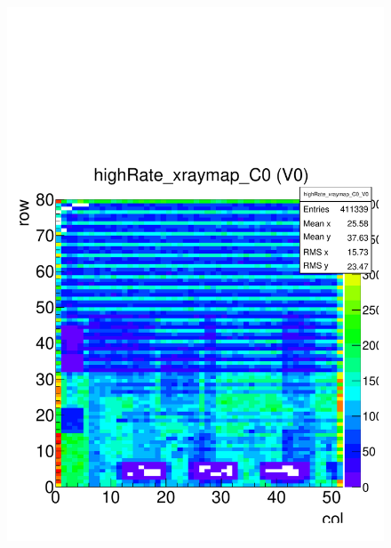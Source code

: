 \documentclass[a4paper,12pt,twoside]{article}
\begin{document}
\begin{figure} [h!]
\begin{minipage}{.48\textwidth}
  \includegraphics[width=\textwidth]{./Efficiency_BackgroundMap.pdf}
  \label{Efficiency-Hitmap}
\end{minipage}
\end{figure}
\end{document}

